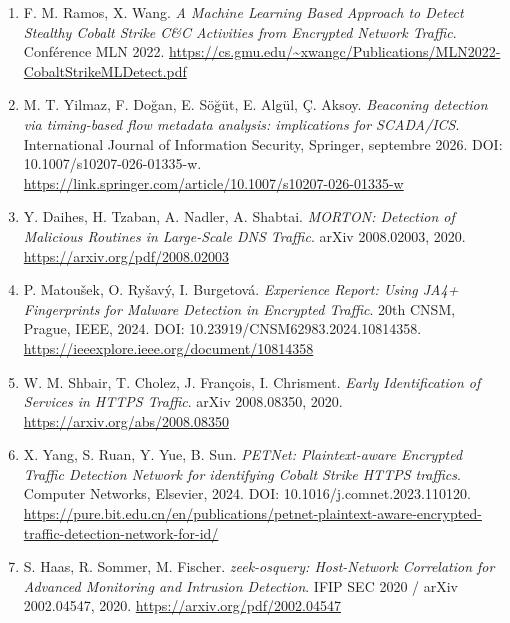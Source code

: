 \documentclass[10pt,a4paper]{article}
\begin{document}
\begin{enumerate}
    \item[{[1]}] F. M. Ramos, X. Wang. \textit{A Machine Learning Based Approach to Detect Stealthy Cobalt Strike C\&C Activities from Encrypted Network Traffic}. Conférence MLN 2022.\newline
    \url{https://cs.gmu.edu/~xwangc/Publications/MLN2022-CobaltStrikeMLDetect.pdf}

    \item[{[2]}] M. T. Yilmaz, F. Doğan, E. Söğüt, E. Algül, Ç. Aksoy. \textit{Beaconing detection via timing-based flow metadata analysis: implications for SCADA/ICS}. International Journal of Information Security, Springer, septembre 2026. DOI: 10.1007/s10207-026-01335-w.\newline
    \url{https://link.springer.com/article/10.1007/s10207-026-01335-w}

    \item[{[3]}] Y. Daihes, H. Tzaban, A. Nadler, A. Shabtai. \textit{MORTON: Detection of Malicious Routines in Large-Scale DNS Traffic}. arXiv 2008.02003, 2020.\newline
    \url{https://arxiv.org/pdf/2008.02003}

    \item[{[4]}] P. Matoušek, O. Ryšavý, I. Burgetová. \textit{Experience Report: Using JA4+ Fingerprints for Malware Detection in Encrypted Traffic}. 20th CNSM, Prague, IEEE, 2024. DOI: 10.23919/CNSM62983.2024.10814358.\newline
    \url{https://ieeexplore.ieee.org/document/10814358}

    \item[{[5]}] W. M. Shbair, T. Cholez, J. François, I. Chrisment. \textit{Early Identification of Services in HTTPS Traffic}. arXiv 2008.08350, 2020.\newline
    \url{https://arxiv.org/abs/2008.08350}

    \item[{[6]}] X. Yang, S. Ruan, Y. Yue, B. Sun. \textit{PETNet: Plaintext-aware Encrypted Traffic Detection Network for identifying Cobalt Strike HTTPS traffics}. Computer Networks, Elsevier, 2024. DOI: 10.1016/j.comnet.2023.110120.\newline
    \url{https://pure.bit.edu.cn/en/publications/petnet-plaintext-aware-encrypted-traffic-detection-network-for-id/}

    \item[{[7]}] S. Haas, R. Sommer, M. Fischer. \textit{zeek-osquery: Host-Network Correlation for Advanced Monitoring and Intrusion Detection}. IFIP SEC 2020 / arXiv 2002.04547, 2020.\newline
    \url{https://arxiv.org/pdf/2002.04547}


\end{enumerate}
\end{document}
